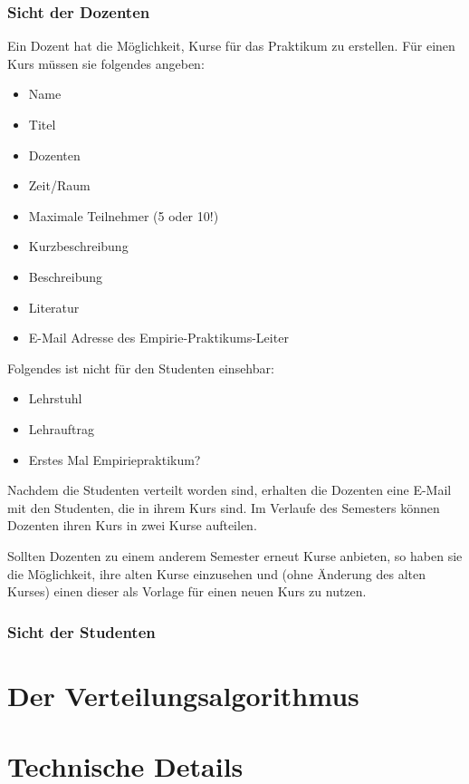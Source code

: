 \documentclass[12pt,a4paper]{article}
\begin{document}
                
            \subsubsection{Sicht der Dozenten}
            Ein Dozent hat die Möglichkeit, Kurse für das Praktikum zu erstellen. Für einen Kurs müssen sie folgendes angeben:
            \begin{itemize}
            \item Name
            \item Titel
            \item Dozenten
            \item Zeit/Raum
            \item Maximale Teilnehmer (5 oder 10!)
            \item Kurzbeschreibung
            \item Beschreibung
            \item Literatur
            \item E-Mail Adresse des Empirie-Praktikums-Leiter %
            \end{itemize}
            Folgendes ist nicht für den Studenten einsehbar:
            \begin{itemize}
            \item Lehrstuhl
            \item Lehrauftrag
            \item Erstes Mal Empiriepraktikum?
            \end{itemize}
            
            Nachdem die Studenten verteilt worden sind, erhalten die Dozenten eine E-Mail mit den Studenten, die in ihrem Kurs sind.
            Im Verlaufe des Semesters können Dozenten ihren Kurs in zwei Kurse aufteilen.
            
            Sollten Dozenten zu einem anderem Semester erneut Kurse anbieten, so haben sie die Möglichkeit, ihre alten Kurse einzusehen und (ohne Änderung des alten Kurses) einen dieser als Vorlage für einen neuen Kurs zu nutzen.

                
            \subsubsection{Sicht der Studenten}
            
    
    \section{Der Verteilungsalgorithmus}
    
    \section{Technische Details}
    
    
\end{document}
